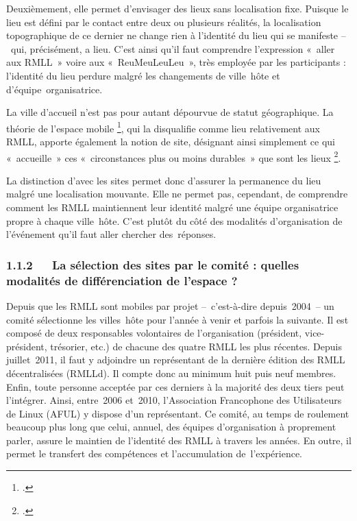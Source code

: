\documentclass{FramateX}
\begin{document}
\begin{refsection}
Deuxièmement, elle permet d'envisager des lieux sans localisation fixe.
Puisque le lieu est défini par le contact entre deux ou plusieurs
réalités, la localisation topographique de ce dernier ne change rien à
l'identité du lieu qui se manifeste –~qui, précisément,
a lieu. C'est ainsi qu'il faut comprendre l'expression
«~aller aux RMLL~» voire aux
«~ReuMeuLeuLeu~», très employée par les
participants : l'identité du lieu perdure malgré les changements de
ville~hôte et d'équipe~organisatrice.

La ville d'accueil n'est pas pour autant dépourvue de statut
géographique. La théorie de l'espace mobile \footnote{\cite{retailleespace2005}.}, qui la disqualifie comme lieu relativement aux RMLL, apporte
également la notion de site, désignant ainsi simplement ce qui
«~accueille~» ces
«~circonstances plus ou moins durables~» que sont
les lieux
\footnote{\cite[p.~20]{retailleles2012}.}.

La distinction d'avec les sites permet donc d'assurer la permanence du
lieu malgré une localisation mouvante. Elle ne permet pas, cependant,
de comprendre comment les RMLL maintiennent leur identité malgré une
équipe organisatrice propre à chaque ville~hôte. C'est plutôt du côté
des modalités d'organisation de l'événement qu'il faut aller chercher
des~réponses.

\subsubsection*{1.1.2~~~La sélection des sites par le comité : quelles modalités de différenciation de l'espace ?}
{}

Depuis que les RMLL sont mobiles par projet
 –~c'est-à-dire
depuis~2004~– un
comité sélectionne les villes~hôte pour l'année à venir et parfois la
suivante. Il est composé de deux responsables volontaires de
l'organisation (président, vice-président, trésorier, etc.) de chacune
des quatre RMLL les plus récentes. Depuis juillet~2011, il faut y
adjoindre un représentant de la dernière édition des RMLL
décentralisées (RMLLd). Il compte donc au minimum huit puis neuf
membres. Enfin, toute personne acceptée par ces derniers à la majorité
des deux tiers peut l'intégrer. Ainsi, entre~2006 et~2010,
l'Association Francophone des Utilisateurs de Linux (AFUL) y dispose
d'un représentant. Ce comité, au temps de roulement beaucoup plus long
que celui, annuel, des équipes d'organisation à proprement parler,
assure le maintien de l'identité des RMLL à travers les années. En
outre, il permet le transfert des compétences et l'accumulation
de~l'expérience.


\end{refsection}
\end{document}

